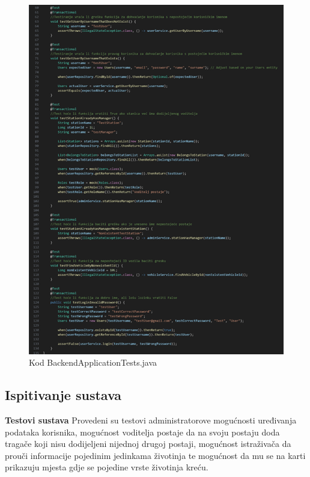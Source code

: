 			\begin{figure}[H]
				\includegraphics[scale=1]{slike/BackendApplicationTests.png}
				\centering
				\caption{Kod BackendApplicationTests.java}
				\label{fig:BackendApplicationTests}
			\end{figure}


			\subsection{Ispitivanje sustava}

			\textbf{Testovi sustava}
			Provedeni su testovi administratorove mogućnosti uređivanja podataka 
			korisnika, mogućnost voditelja postaje da na svoju postaju doda 
			tragače koji nisu dodijeljeni nijednoj drugoj postaji, mogućnost 
			istraživača da prouči informacije pojedinim jedinkama životinja 
			te mogućnost da mu se na karti prikazuju mjesta gdje se pojedine 
			vrste životinja kreću.
	
